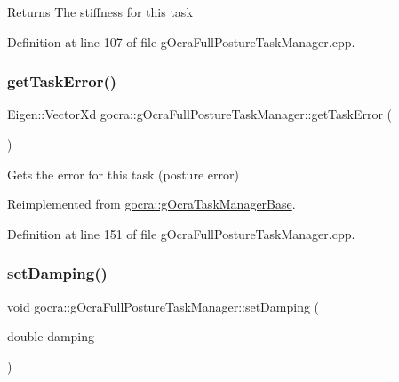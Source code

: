 \begin{DoxyReturn}{Returns}
The stiffness for this task 
\end{DoxyReturn}


Definition at line 107 of file g\+Ocra\+Full\+Posture\+Task\+Manager.\+cpp.

\hypertarget{classgocra_1_1gOcraFullPostureTaskManager_a8be4aac1fe7ec4f68e31f72a8aab6af8}{}\label{classgocra_1_1gOcraFullPostureTaskManager_a8be4aac1fe7ec4f68e31f72a8aab6af8} 
\subsubsection{\texorpdfstring{get\+Task\+Error()}{getTaskError()}}
{\footnotesize\ttfamily Eigen\+::\+Vector\+Xd gocra\+::g\+Ocra\+Full\+Posture\+Task\+Manager\+::get\+Task\+Error (\begin{DoxyParamCaption}{ }\end{DoxyParamCaption})\hspace{0.3cm}{\ttfamily [virtual]}}

Gets the error for this task (posture error) 

Reimplemented from \hyperlink{classgocra_1_1gOcraTaskManagerBase_a5c40a14b3a1d5a6519da422310d28f97}{gocra\+::g\+Ocra\+Task\+Manager\+Base}.



Definition at line 151 of file g\+Ocra\+Full\+Posture\+Task\+Manager.\+cpp.

\hypertarget{classgocra_1_1gOcraFullPostureTaskManager_a0080d88c68d85320d0f0f68baf0260ad}{}\label{classgocra_1_1gOcraFullPostureTaskManager_a0080d88c68d85320d0f0f68baf0260ad} 
\subsubsection{\texorpdfstring{set\+Damping()}{setDamping()}}
{\footnotesize\ttfamily void gocra\+::g\+Ocra\+Full\+Posture\+Task\+Manager\+::set\+Damping (\begin{DoxyParamCaption}\item[{double}]{damping }\end{DoxyParamCaption})}

